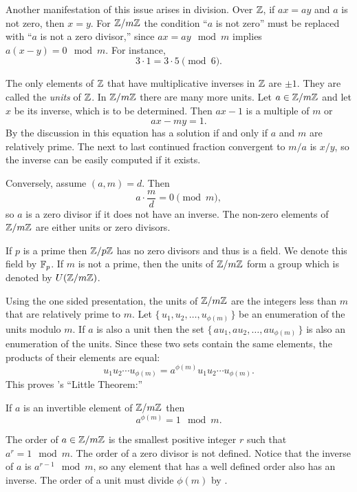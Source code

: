 Another manifestation of this issue arises in division.  Over $\mathbb{Z}$, if
$ax = ay$ and $a$ is not zero, then $x = y$.  For $\mathbb{Z}/m\mathbb{Z}$ the
condition ``$a$ is not zero'' must be replaced with ``$a$ is not a
zero divisor,'' since $ax = ay \mod{m}$ implies $a (x -y) =
0 \mod{m}$.  For instance, 
\[
3 \cdot 1 = 3 \cdot 5 \pmod{6}.
\]

The only elements of $\mathbb{Z}$ that have multiplicative inverses in $\mathbb{Z}$
are $\pm 1$.  They are called the {\em units\/} of $\mathbb{Z}$. In $\mathbb{Z}/m\mathbb{Z}$ there are many more units.  Let $a \in \mathbb{Z}/m\mathbb{Z}$
and let $x$ be its inverse, which is to be determined.  Then $ax - 1$
is a multiple of $m$ or
\[
ax - m y = 1.
\]
By the discussion in  this equation has a
solution if and only if $a$ and $m$ are relatively prime.  The next to
last continued fraction convergent to $m/a$ is $x/y$, so the inverse
can be easily computed if it exists.

Conversely, assume $(a, m) = d$.  Then
\[
a \cdot \frac{m}{d} = 0 \pmod{m},
\]
so $a$ is a zero divisor if it does not have an inverse.  The non-zero
elements of $\mathbb{Z}/m\mathbb{Z}$ are either units or zero divisors.

If $p$ is a prime then $\mathbb{Z}/p\mathbb{Z}$ has no zero divisors and thus is a
field.  We denote this field by $\mathbb{F}_p$.  If $m$ is not a prime, then
the units of $\mathbb{Z}/m\mathbb{Z}$ form a group which is denoted by $U(\mathbb{Z}/m\mathbb{Z})$.

\medskip
Using the one sided presentation, the units of $\mathbb{Z}/m\mathbb{Z}$ are the
integers less than $m$ that are relatively prime to $m$.  Let
$\{\,u_1, u_2, \ldots, u_{\phi(m)}\,\}$ be an enumeration of the units
modulo $m$.  If $a$ is also a unit then the set $\{\,a u_1, a u_2,
\ldots, a u_{\phi(m)}\,\}$ is also an enumeration of the units.  Since
these two sets contain the same elements, the products of their
elements are equal:
\[
u_1 u_2 \cdots u_{\phi(m)} = a^{\phi(m)} u_1 u_2 \cdots u_{\phi(m)}.
\]
This proves {\Fermat}'s ``Little Theorem:''

\begin{proposition} \label{FermatLittle:Prop}
If $a$ is an invertible element of $\mathbb{Z}/m\mathbb{Z}$ then 
\[
a^{\phi(m)} = 1 \mod{m}.
\]
\end{proposition}

The order of $a \in \mathbb{Z}/m\mathbb{Z}$ is the
smallest positive integer $r$ such that $a^r = 1 \mod{m}$.  The order
of a zero divisor is not defined.  Notice that the inverse of $a$ is
$a^{r-1} \mod{m}$, so any element that has a well defined order also
has an inverse.  The order of a unit must divide $\phi(m)$ by
.

